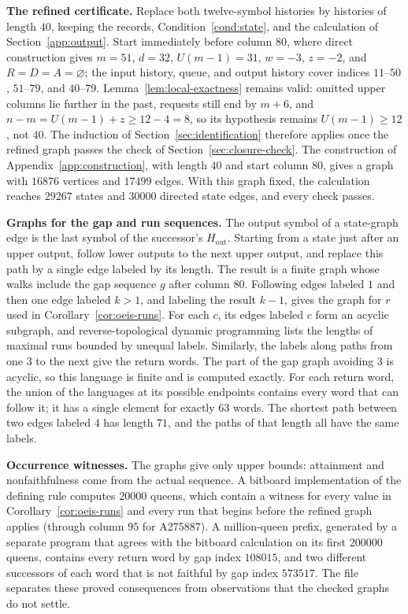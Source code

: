 \medskip\noindent
\textbf{The refined certificate.}
Replace both twelve-symbol histories by histories of length $40$,
keeping the records, Condition~\ref{cond:state}, and the calculation
of Section~\ref{app:output}. Start immediately before column $80$,
where direct construction gives $m=51$, $d=32$, $U(m-1)=31$, $w=-3$,
$z=-2$, and $R=D=A=\varnothing$; the input history, queue, and output
history cover indices $11$--$50$, $51$--$79$, and $40$--$79$.
Lemma~\ref{lem:local-exactness} remains valid: omitted upper columns
lie further in the past, requests still end by $m+6$, and
$n-m=U(m-1)+z\ge12-4=8$, so its hypothesis remains $U(m-1)\ge12$,
not $40$. The induction of Section~\ref{sec:identification}
therefore applies once the refined graph passes the check of
Section~\ref{sec:closure-check}. The construction of
Appendix~\ref{app:construction}, with length $40$ and start
column $80$, gives a graph with $16876$ vertices and $17499$ edges.
With this graph fixed, the calculation reaches $29267$ states and
$30000$ directed state edges, and every check passes.

\medskip\noindent
\textbf{Graphs for the gap and run sequences.}
The output symbol of a state-graph edge is the last symbol of the
successor's $H_{\mathrm{out}}$. Starting from a state just after an
upper output, follow lower outputs to the next upper output, and
replace this path by a single edge labeled by its length. The result
is a finite graph whose walks include the gap sequence $g$ after
column $80$. Following edges labeled $1$ and then one edge labeled
$k>1$, and labeling the result $k-1$, gives the graph for $r$ used in
Corollary~\ref{cor:oeis-runs}. For each $c$, its edges labeled $c$
form an acyclic subgraph, and reverse-topological dynamic programming
lists the lengths of maximal runs bounded by unequal labels.
Similarly, the labels along paths from one $3$ to the next give the
return words. The part of the gap graph avoiding $3$ is acyclic, so
this language is finite and is computed exactly. For each return word,
the union of the languages at its possible endpoints contains every
word that can follow it; it has a single element for exactly $63$
words. The shortest path between two edges labeled $4$ has length
$71$, and the paths of that length all have the same labels.

\medskip\noindent
\textbf{Occurrence witnesses.}
The graphs give only upper bounds: attainment and nonfaithfulness
come from the actual sequence. A bitboard implementation of the
defining rule computes $20000$ queens, which contain a witness for
every value in Corollary~\ref{cor:oeis-runs} and every run that
begins before the refined graph applies (through column $95$ for
A275887). A million-queen prefix, generated by a separate program
that agrees with the bitboard calculation on its first $200000$
queens, contains every return word by gap index $108015$, and two
different successors of each word that is not faithful by gap index
$573517$. The file  separates these proved
consequences from observations that the checked graphs do not settle.

